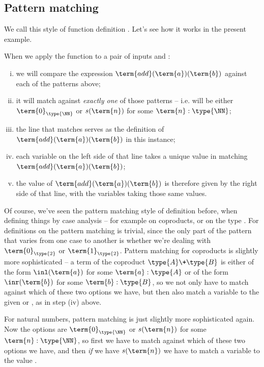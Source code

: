 \subsection{Pattern matching}
\label{sec:NaturalNumbers-PatternMatching}

We call this style of function definition .  Let's see how it works in the present example.

When we apply the  function to a pair of inputs  and :
\begin{enumerate}[(i)]
\item we will compare the expression 
$\term{add}(\term{a})(\term{b})$ against each of the patterns above; 
\item it will match against \emph{exactly one} of those patterns -- i.e.  will be either $\term{0}_{\type{\NN}}$ or $s(\term{n})$ for some $\term{n}:\type{\NN}$;
\item the line that matches serves as the definition of $\term{add}(\term{a})(\term{b})$ in this instance;
\item each variable on the left side of that line takes a unique value in matching $\term{add}(\term{a})(\term{b})$;
\item the value of $\term{add}(\term{a})(\term{b})$ is therefore given by the right side of that line, with the variables taking those same values.
\end{enumerate}

Of course, we've seen the pattern matching style of definition before, when defining things by case analysis -- for example on coproducts, or on the type .  
For definitions on  the pattern matching is trivial, since the only part of the pattern that varies from one case to another is whether we're dealing with $\term{0}_{\type{2}}$ or $\term{1}_{\type{2}}$.  
Pattern matching for coproducts is slightly more sophisticated -- a term of the coproduct $\type{A} \+ \type{B}$ is either of the form $\inl(\term{a})$ for some $\term{a}:\type{A}$ or of the form $\inr(\term{b})$ for some $\term{b}:\type{B}$, so we not only have to match against which of these two options we have, but then also match a variable to the given  or , as in step (iv) above.

For natural numbers, pattern matching is just slightly more sophisticated again.  Now the options are $\term{0}_{\type{\NN}}$ or $s(\term{n})$ for some $\term{n}:\type{\NN}$, so first we have to match against which of these two options we have, and then \emph{if} we have $s(\term{n})$ we have to match a variable to the value .

